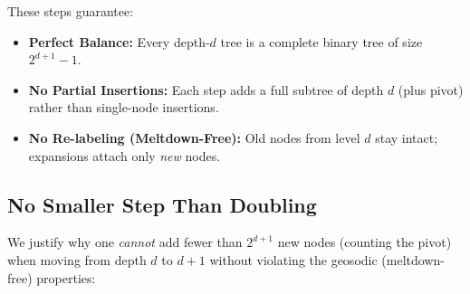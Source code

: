 These steps guarantee:
\begin{itemize}
  \item \textbf{Perfect Balance:} Every depth-$d$ tree is a complete binary tree of size $2^{d+1}-1$.
  \item \textbf{No Partial Insertions:} Each step adds a full subtree of depth $d$ (plus pivot) 
        rather than single-node insertions.
  \item \textbf{No Re-labeling (Meltdown-Free):} Old nodes from level $d$ stay intact; 
        expansions attach only \emph{new} nodes.
\end{itemize}

\subsection{No Smaller Step Than Doubling}
\label{subsec:no-smaller}

We justify why one \emph{cannot} add fewer than $2^{d+1}$ new nodes (counting the pivot) 
when moving from depth $d$ to $d+1$ without violating the geosodic (meltdown-free) properties:

